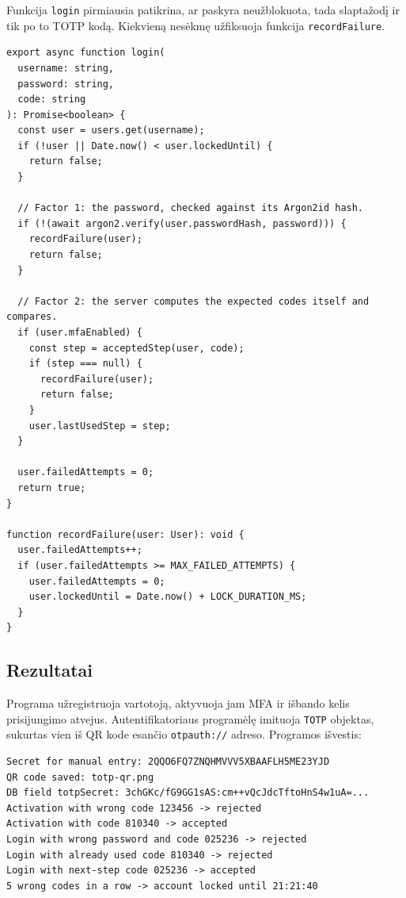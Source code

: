 Funkcija \texttt{login} pirmiausia patikrina, ar paskyra neužblokuota, tada slaptažodį ir tik po to TOTP kodą. Kiekvieną nesėkmę užfiksuoja funkcija \texttt{recordFailure}.

\begin{lstlisting}
export async function login(
  username: string,
  password: string,
  code: string
): Promise<boolean> {
  const user = users.get(username);
  if (!user || Date.now() < user.lockedUntil) {
    return false;
  }

  // Factor 1: the password, checked against its Argon2id hash.
  if (!(await argon2.verify(user.passwordHash, password))) {
    recordFailure(user);
    return false;
  }

  // Factor 2: the server computes the expected codes itself and compares.
  if (user.mfaEnabled) {
    const step = acceptedStep(user, code);
    if (step === null) {
      recordFailure(user);
      return false;
    }
    user.lastUsedStep = step;
  }

  user.failedAttempts = 0;
  return true;
}

function recordFailure(user: User): void {
  user.failedAttempts++;
  if (user.failedAttempts >= MAX_FAILED_ATTEMPTS) {
    user.failedAttempts = 0;
    user.lockedUntil = Date.now() + LOCK_DURATION_MS;
  }
}
\end{lstlisting}

\subsection{Rezultatai}
\label{subsec:rezultatai}

Programa užregistruoja vartotoją, aktyvuoja jam MFA ir išbando kelis prisijungimo atvejus. Autentifikatoriaus programėlę imituoja \texttt{TOTP} objektas, sukurtas vien iš QR kode esančio \texttt{otpauth://} adreso. Programos išvestis:

\begin{Verbatim}[frame=single, fontsize=\footnotesize, formatcom=\setstretch{1}]
Secret for manual entry: 2QQO6FQ7ZNQHMVVV5XBAAFLH5ME23YJD
QR code saved: totp-qr.png
DB field totpSecret: 3chGKc/fG9GG1sAS:cm++vQcJdcTftoHnS4w1uA=...
Activation with wrong code 123456 -> rejected
Activation with code 810340 -> accepted
Login with wrong password and code 025236 -> rejected
Login with already used code 810340 -> rejected
Login with next-step code 025236 -> accepted
5 wrong codes in a row -> account locked until 21:21:40
\end{Verbatim}

